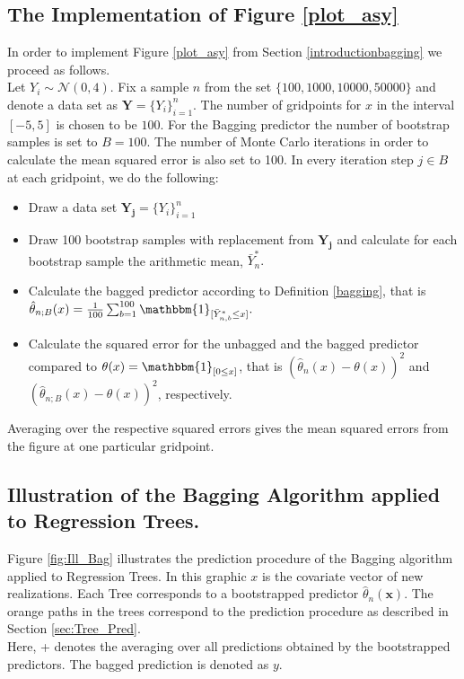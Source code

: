 \subsection{The Implementation of Figure \ref{plot_asy}}\label{sec:App_FiniteSample}
In order to implement Figure \ref{plot_asy} from Section \ref{introductionbagging} we proceed as follows. \\
Let $Y_i \sim \mathcal{N}(0,4)$. Fix a sample $n$ from the set $\{100, 1000, 10000, 50000\}$ and denote a data set as $\mathbf{Y}=\{Y_i\}_{i=1}^n$.
The number of gridpoints for $x$ in the interval $[-5,5]$ is chosen to be $100$.
For the Bagging predictor the number of bootstrap samples is set to $B=100$.
The number of Monte Carlo iterations in order to calculate the mean squared error is also set to 100.
In every iteration step $j \in B$ at each gridpoint, we do the following:
\begin{itemize}
\item Draw a data set $\mathbf{Y_j}=\{Y_i\}_{i=1}^n$
\item Draw 100 bootstrap samples with replacement from $\mathbf{Y_j}$ and calculate for each bootstrap sample the arithmetic mean, $\bar{Y}_{n}^{*}.$
\item Calculate the bagged predictor according to Definition \ref{bagging}, that is $\hat{\theta}_{n;B}(x) = \frac{1}{100}\sum_{b=1}^{100}\mathbbm{1}_{[\bar{Y}_{n,b}^{*} \leq x]}.$
\item Calculate the squared error for the unbagged and the bagged predictor compared to $\theta(x)=\mathbbm{1}_{[0 \leq x]}$, that is $(\hat{\theta}_{n}(x)-\theta(x))^2$ and $(\hat{\theta}_{n;B}(x)-\theta(x))^2$, respectively.
\end{itemize}
Averaging over the respective squared errors gives the mean squared errors from the figure at one particular gridpoint.


\subsection{Illustration of the Bagging Algorithm applied to Regression Trees.}
\label{App:Ill_Bag}
Figure \ref{fig:Ill_Bag} illustrates the prediction procedure of the Bagging algorithm applied to Regression Trees. In this graphic $x$ is the covariate vector of new realizations.
Each Tree corresponds to a bootstrapped predictor $\hat{\theta}_n(\mathbf{x})$.
The orange paths in the trees correspond to the prediction procedure as described in Section \ref{sec:Tree_Pred}.\\
Here, + denotes the averaging over all predictions obtained by the bootstrapped predictors. The bagged prediction is denoted as $y$.

